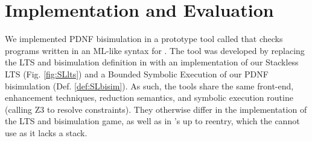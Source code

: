 
%
%  
%
%  
%
\section{Implementation and Evaluation}
\label{sec:imp}
We implemented PDNF bisimulation in a prototype tool called \SLHobbit{} that checks programs written in an ML-like syntax for \lang. The tool was developed by replacing the LTS and bisimulation definition in \Hobbit{}\cite{KoutavasLT22} with an implementation of our Stackless LTS (Fig. \ref{fig:SLlts}) and a Bounded Symbolic Execution of our PDNF bisimulation (Def. \ref{def:SLbisim}). As such, the tools share the same front-end, enhancement techniques, reduction semantics, and symbolic execution routine (calling Z3 to resolve constraints). They {otherwise} differ in the implementation of the LTS and bisimulation game, as well as in \Hobbit's up to reentry, which the \SLHobbit{} cannot use as it lacks a stack.

